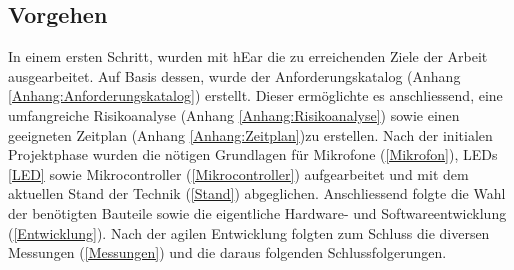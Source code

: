 \documentclass[12pt]{article}
\begin{document}
	\subsection{Vorgehen}
	In einem ersten Schritt, wurden mit hEar die zu erreichenden Ziele der Arbeit ausgearbeitet. Auf Basis dessen, wurde der Anforderungskatalog (Anhang \ref{Anhang:Anforderungskatalog}) erstellt. Dieser ermöglichte es anschliessend, eine umfangreiche Risikoanalyse (Anhang \ref{Anhang:Risikoanalyse}) sowie einen geeigneten Zeitplan (Anhang \ref{Anhang:Zeitplan})zu erstellen. Nach der initialen Projektphase wurden die nötigen Grundlagen für Mikrofone (\ref{Mikrofon}), LEDs \ref{LED} sowie Mikrocontroller (\ref{Mikrocontroller}) aufgearbeitet und mit dem aktuellen Stand der Technik (\ref{Stand}) abgeglichen. Anschliessend folgte die Wahl der benötigten Bauteile sowie die eigentliche Hardware- und Softwareentwicklung (\ref{Entwicklung}). Nach der agilen Entwicklung folgten zum Schluss die diversen Messungen (\ref{Messungen}) und die daraus folgenden Schlussfolgerungen.
	
	\newpage
\end{document}
